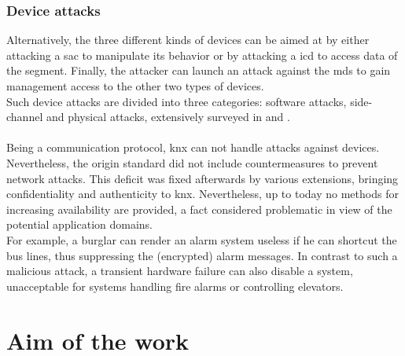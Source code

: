 \subsubsection{Device attacks}
Alternatively, the three different kinds of devices can be aimed at by either attacking a \gls{sac} to manipulate its behavior or by attacking a \gls{icd} to access data of the segment.
Finally, the attacker can launch an attack against the \glspl{md} to gain management access to the other two types of devices.
\\
Such device attacks are divided into three categories: software attacks, side-channel and physical attacks, extensively surveyed in \cite{5332331} and \cite{secAn}.
\\
\\
Being a communication protocol, \gls{knx} can not handle attacks against devices.
Nevertheless, the origin standard did not include countermeasures to prevent network attacks. This deficit was fixed afterwards by various extensions, bringing confidentiality and
authenticity to \gls{knx}. Nevertheless, up to today no methods for increasing availability are provided, a fact considered problematic in view of the potential application domains.
\\
For example, a burglar can render an alarm system useless if he can shortcut the bus lines, thus suppressing the (encrypted) alarm messages. In contrast to such a malicious attack, a transient
hardware failure can also disable a system, unacceptable for systems handling fire alarms or controlling elevators. 

\section{Aim of the work}


